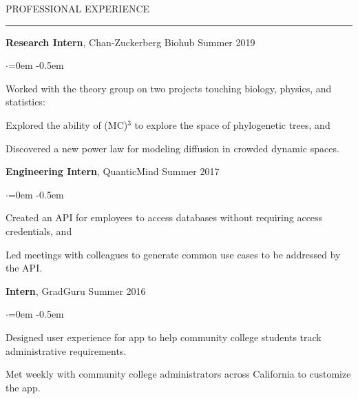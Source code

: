 \documentclass{resume} %
\renewenvironment{rSection}[1]{
\sectionskip
\textcolor{CarnegieMellonRed}{\MakeUppercase{#1}}
\sectionlineskip
\hrule
\begin{list}{}{
\setlength{\leftmargin}{1.5em}
}
\item[]
}{
\end{list}
}
\begin{document}
\begin{rSection}{Professional Experience}	
{\bf Research Intern}, Chan-Zuckerberg Biohub \hfill { Summer 2019}
\begin{list}{$\cdot$}{\leftmargin=0em} 
    \itemsep -0.5em \vspace{-0.5em}
      \item Worked with the theory group on two projects touching biology, physics, and statistics:
      \item Explored the ability of (MC)$^3$ to explore the space of phylogenetic trees, and
      \item Discovered a new power law for modeling diffusion in crowded dynamic spaces.
  \end{list}
  \vspace{1.em}

{\bf Engineering Intern}, QuanticMind \hfill { Summer 2017}
\begin{list}{$\cdot$}{\leftmargin=0em} 
    \itemsep -0.5em \vspace{-0.5em}
      \item Created an API for employees to access databases without requiring access credentials, and
      \item Led meetings with colleagues to generate common use cases to be addressed by the API.
  \end{list}
  \vspace{1.em}

{\bf Intern}, GradGuru \hfill { Summer 2016}
\begin{list}{$\cdot$}{\leftmargin=0em} 
    \itemsep -0.5em \vspace{-0.5em}
      \item Designed user experience for app to help community college students track administrative requirements.
      \item Met weekly with community college administrators across California to customize the app.
  \end{list}
  \vspace{1.em}

\end{rSection}
\end{document}
